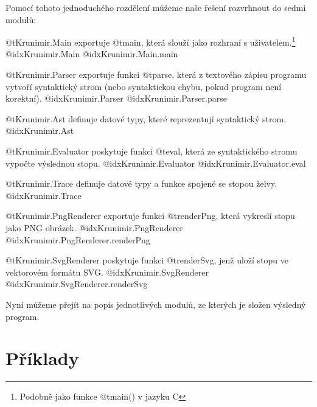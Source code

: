 Pomocí tohoto jednoduchého rozdělení můžeme naše řešení rozvrhnout do sedmi
modulů:

\begin{description}

\item @t{Krunimir.Main} exportuje @t{main}, která slouží jako rozhraní s
uživatelem.\footnote{Podobně jako funkce @t{main()} v jazyku C}
  @idx{Krunimir.Main}
  @idx{Krunimir.Main.main}

\item @t{Krunimir.Parser} exportuje funkci @t{parse}, která z textového
zápisu programu vytvoří syntaktický strom (nebo syntaktickou chybu, pokud
program není korektní).
  @idx{Krunimir.Parser}
  @idx{Krunimir.Parser.parse}

\item @t{Krunimir.Ast} definuje datové typy, které reprezentují syntaktický
strom.
  @idx{Krunimir.Ast}

\item @t{Krunimir.Evaluator} poskytuje funkci @t{eval}, která ze
syntaktického stromu vypočte výslednou stopu.
  @idx{Krunimir.Evaluator}
  @idx{Krunimir.Evaluator.eval}

\item @t{Krunimir.Trace} definuje datové typy a funkce spojené se stopou želvy.
  @idx{Krunimir.Trace}

\item @t{Krunimir.PngRenderer} exportuje funkci @t{renderPng}, která vykreslí
  stopu jako PNG obrázek.
  @idx{Krunimir.PngRenderer}
  @idx{Krunimir.PngRenderer.renderPng}

\item @t{Krunimir.SvgRenderer} poskytuje funkci @t{renderSvg}, jenž uloží stopu
  ve vektorovém formátu SVG.
  @idx{Krunimir.SvgRenderer}
  @idx{Krunimir.SvgRenderer.renderSvg}

\end{description}

Nyní můžeme přejít na popis jednotlivých modulů, ze kterých je složen výsledný
program. 









\section{Příklady}

